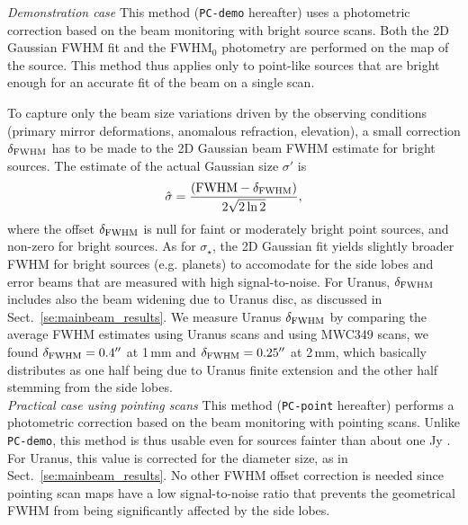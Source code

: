 \noindent \emph{Demonstration case} This method ({\tt PC-demo} hereafter) uses a
photometric correction based on the beam monitoring with bright source
scans. Both the 2D Gaussian FWHM fit and the FWHM$_0$ photometry are performed
on the map of the source. This method thus applies only to point-like sources
that are bright enough for an accurate fit of the beam on a single scan.

To capture only the beam size variations driven by the
observing conditions (primary mirror deformations, anomalous
refraction, elevation), a small correction $\delta_{\rm{FWHM}}$ has to be made to
the 2D Gaussian beam FWHM estimate for bright sources. The estimate of the
actual Gaussian size $\sigma '$ is
\begin{equation}
  \hat{\sigma} = \frac{(\rm{FWHM} - \delta_{\rm{FWHM}})}{2\sqrt{2 \ln{2}}}, 
\end{equation} 
where the offset $\delta_{\rm{FWHM}}$ is null for faint or moderately
bright point sources, and non-zero for bright sources.
As for $\sigma_\star$, the 2D Gaussian fit yields slightly broader
FWHM for bright sources (e.g. planets) to accomodate
for the side lobes and error beams that are measured with high signal-to-noise.
For Uranus, $\delta_{\rm{FWHM}}$ includes also the beam widening due
to Uranus disc, as discussed in Sect.~\ref{se:mainbeam_results}.
We measure Uranus $\delta_{\rm{FWHM}}$
by comparing the average %
FWHM estimates using Uranus
scans and using MWC349 scans, we found $\delta_{\rm{FWHM}} = 0.4''$ at
1\,mm and $\delta_{\rm{FWHM}} = 0.25''$ at 2\,mm, which basically
distributes as one half being due to Uranus finite extension and the
other half stemming from the side lobes.\\

\noindent \emph{Practical case using pointing scans} This method ({\tt PC-point}
hereafter) performs a photometric correction based on the beam monitoring with
pointing scans. Unlike {\tt PC-demo}, this method is thus usable even for
sources fainter than about one Jy . For Uranus, this value is corrected for the diameter size, as
  in Sect.~\ref{se:mainbeam_results}.
No other FWHM offset correction is needed since pointing scan maps
have a low signal-to-noise ratio that prevents the geometrical FWHM
from being significantly affected by the side lobes.


